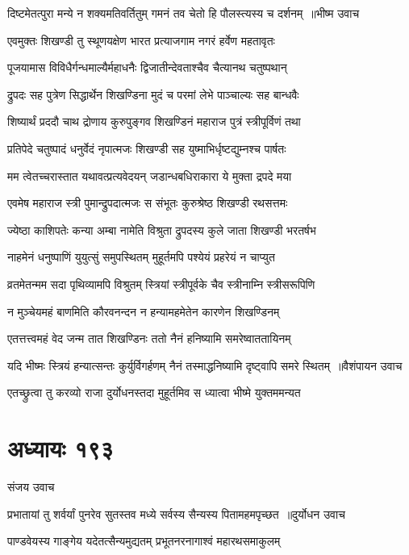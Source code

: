 \threelineshloka
{दिष्टमेतत्पुरा मन्ये न शक्यमतिवर्तितुम्}
{गमनं तव चेतो हि पौलस्त्यस्य च दर्शनम् ॥भीष्म उवाच}
{}


\twolineshloka
{एवमुक्तः शिखण्डी तु स्थूणयक्षेण भारत}
{प्रत्याजगाम नगरं हर्वेण महतावृतः}


\twolineshloka
{पूजयामास विविधैर्गन्धमाल्यैर्महाधनैः}
{द्विजातीन्देवताश्चैव चैत्यानथ चतुष्पथान्}


\twolineshloka
{द्रुपदः सह पुत्रेण सिद्धार्थेन शिखण्डिना}
{मुदं च परमां लेभे पाञ्चाल्यः सह बान्धवैः}


\twolineshloka
{शिष्यार्थं प्रददौ चाथ द्रोणाय कुरुपुङ्गव}
{शिखण्डिनं महाराज पुत्रं स्त्रीपूर्विणं तथा}


\twolineshloka
{प्रतिपेदे चतुष्पादं धनुर्वेदं नृपात्मजः}
{शिखण्डी सह युष्माभिर्धृष्टद्युम्नश्च पार्षतः}


\twolineshloka
{मम त्वेतच्चरास्तात यथावत्प्रत्यवेदयन्}
{जडान्धबधिराकारा ये मुक्ता द्रपदे मया}


\twolineshloka
{एवमेष महाराज स्त्री पुमान्द्रुपदात्मजः}
{स संभूतः कुरुश्रेष्ठ शिखण्डी रथसत्तमः}


\twolineshloka
{ज्येष्ठा काशिपतेः कन्या अम्बा नामेति विश्रुता}
{द्रुपदस्य कुले जाता शिखण्डी भरतर्षभ}


\twolineshloka
{नाहमेनं धनुष्पाणिं युयुत्सुं समुपस्थितम्}
{मुहूर्तमपि पश्येयं प्रहरेयं न चाप्युत}


\twolineshloka
{व्रतमेतन्मम सदा पृथिव्यामपि विश्रुतम्}
{स्त्रियां स्त्रीपूर्वके चैव स्त्रीनाम्नि स्त्रीसरूपिणि}


\twolineshloka
{न मुञ्चेयमहं बाणमिति कौरवनन्दन}
{न हन्यामहमेतेन कारणेन शिखण्डिनम्}


\twolineshloka
{एतत्तत्त्वमहं वेद जन्म तात शिखण्डिनः}
{ततो नैनं हनिष्यामि समरेष्वाततायिनम्}


\threelineshloka
{यदि भीष्मः स्त्रियं हन्यात्सन्तः कुर्युर्विगर्हणम्}
{नैनं तस्माद्धनिष्यामि दृष्ट्वापि समरे स्थितम् ॥वैशंपायन उवाच}
{}


\twolineshloka
{एतच्छ्रुत्वा तु करव्यो राजा दुर्योधनस्तदा}
{मुहूर्तमिव स ध्यात्वा भीष्मे युक्तममन्यत}


\chapter{अध्यायः १९३}
\twolineshloka
{संजय उवाच}
{}


\threelineshloka
{प्रभातायां तु शर्वर्यां पुनरेव सुतस्तव}
{मध्ये सर्वस्य सैन्यस्य पितामहमपृच्छत ॥दुर्योधन उवाच}
{}


\twolineshloka
{पाण्डवेयस्य गाङ्गेय यदेतत्सैन्यमुद्यतम्}
{प्रभूतनरनागाश्वं महारथसमाकुलम्}


